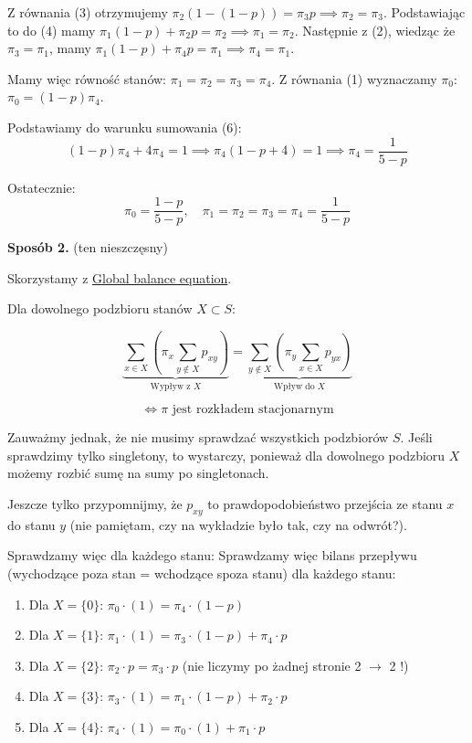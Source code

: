 Z równania (3) otrzymujemy \(\pi_2(1 - (1-p)) = \pi_3 p \implies \pi_2 = \pi_3\).
Podstawiając to do (4) mamy \(\pi_1(1-p) + \pi_2 p = \pi_2 \implies \pi_1 = \pi_2\).
Następnie z (2), wiedząc że \(\pi_3 = \pi_1\), mamy \(\pi_1(1-p) + \pi_4 p = \pi_1 \implies \pi_4 = \pi_1\).

Mamy więc równość stanów: \(\pi_1 = \pi_2 = \pi_3 = \pi_4\).
Z równania (1) wyznaczamy \(\pi_0\): \(\pi_0 = (1 - p)\pi_4\).

Podstawiamy do warunku sumowania (6):
\[
	(1-p)\pi_4 + 4\pi_4 = 1 \implies \pi_4(1 - p + 4) = 1 \implies \pi_4 = \frac{1}{5 - p}
\]

Ostatecznie:
\[
	\pi_0 = \frac{1 - p}{5 - p}, \quad \pi_1 = \pi_2 = \pi_3 = \pi_4 = \frac{1}{5 - p}
\]

\textbf{Sposób 2.} (ten nieszczęsny)

Skorzystamy z \href{https://en.wikipedia.org/wiki/Balance\_equation}{Global balance equation}.

Dla dowolnego podzbioru stanów \(X \subset S\):

\[\underbrace{\sum_{x \in X} \left( \pi_x \sum_{y \notin X} p_{xy}\right)}_{\text{Wypływ z } X} = \underbrace{\sum_{y \notin X} \left( \pi_y \sum_{x \in X} p_{yx}\right)}_{\text{Wpływ do } X}\]

\[ \iff \pi \text{ jest rozkładem stacjonarnym}\]

Zauważmy jednak, że nie musimy sprawdzać wszystkich podzbiorów \(S\).
Jeśli sprawdzimy tylko singletony, to wystarczy, ponieważ dla dowolnego podzbioru \(X\) możemy rozbić sumę na sumy po singletonach.

Jeszcze tylko przypomnijmy, że \(p_{xy}\) to prawdopodobieństwo przejścia ze stanu \(x\) do stanu \(y\)
(nie pamiętam, czy na wykładzie było tak, czy na odwrót?).

Sprawdzamy więc dla każdego stanu:
Sprawdzamy więc bilans przepływu (wychodzące poza stan = wchodzące spoza stanu) dla każdego stanu:
\begin{enumerate}
	\item Dla \(X = \{0\}\): \(\pi_0 \cdot (1) = \pi_4 \cdot (1 - p)\)
	\item Dla \(X = \{1\}\): \(\pi_1 \cdot (1) = \pi_3 \cdot (1 - p) + \pi_4 \cdot p\)
	\item Dla \(X = \{2\}\): \(\pi_2 \cdot p = \pi_3 \cdot p\) \quad (nie liczymy po żadnej stronie 2 \(\rightarrow\) 2 !)
	\item Dla \(X = \{3\}\): \(\pi_3 \cdot (1) = \pi_1 \cdot (1 - p) + \pi_2 \cdot p\)
	\item Dla \(X = \{4\}\): \(\pi_4 \cdot (1) = \pi_0 \cdot (1) + \pi_1 \cdot p\)
\end{enumerate}

